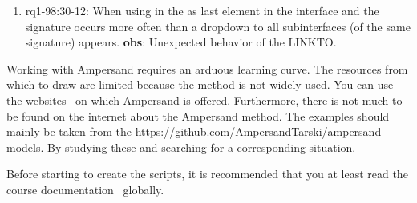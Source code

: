 \begin{enumerate}
    \item rq1-98:30-12: When using  in the  as last element in the interface and the signature occurs more often than a dropdown to all subinterfaces (of the same signature) appears.
    \newline\textbf{obs}: Unexpected behavior of the LINKTO.
    
\end{enumerate}

Working with Ampersand requires an arduous learning curve.
The resources from which to draw are limited because the method is not widely used.
You can use the websites~\footnotemark{} on which Ampersand is offered.
Furthermore, there is not much to be found on the internet about the Ampersand method.
The examples should mainly be taken from the \url{https://github.com/AmpersandTarski/ampersand-models}.
By studying these and searching for a corresponding situation.

Before starting to create the scripts, it is recommended that you at least read the course documentation~ globally.



